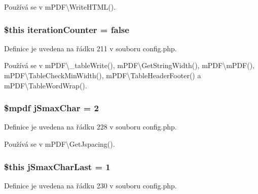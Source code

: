 Používá se v m\-P\-D\-F\textbackslash{}\-Write\-H\-T\-M\-L().

\hypertarget{config_8php_a8efcd7889bdb2ee6616ad96e937d1fb8}{
\subsubsection[{iteration\-Counter}]{\setlength{\rightskip}{0pt plus 5cm}\$this iteration\-Counter = {\bf false}}}\label{config_8php_a8efcd7889bdb2ee6616ad96e937d1fb8}


Definice je uvedena na řádku 211 v souboru config.\-php.



Používá se v m\-P\-D\-F\textbackslash{}\-\_\-table\-Write(), m\-P\-D\-F\textbackslash{}\-Get\-String\-Width(), m\-P\-D\-F\textbackslash{}m\-P\-D\-F(), m\-P\-D\-F\textbackslash{}\-Table\-Check\-Min\-Width(), m\-P\-D\-F\textbackslash{}\-Table\-Header\-Footer() a m\-P\-D\-F\textbackslash{}\-Table\-Word\-Wrap().

\hypertarget{config_8php_adbe88fd58b98ddbc5784838af76215ff}{
\subsubsection[{j\-Smax\-Char}]{\setlength{\rightskip}{0pt plus 5cm}\$mpdf j\-Smax\-Char = 2}}\label{config_8php_adbe88fd58b98ddbc5784838af76215ff}


Definice je uvedena na řádku 228 v souboru config.\-php.



Používá se v m\-P\-D\-F\textbackslash{}\-Get\-Jspacing().

\hypertarget{config_8php_a88fd206d3a2da230f861d6f1f376a5c5}{
\subsubsection[{j\-Smax\-Char\-Last}]{\setlength{\rightskip}{0pt plus 5cm}\$this j\-Smax\-Char\-Last = 1}}\label{config_8php_a88fd206d3a2da230f861d6f1f376a5c5}


Definice je uvedena na řádku 230 v souboru config.\-php.



